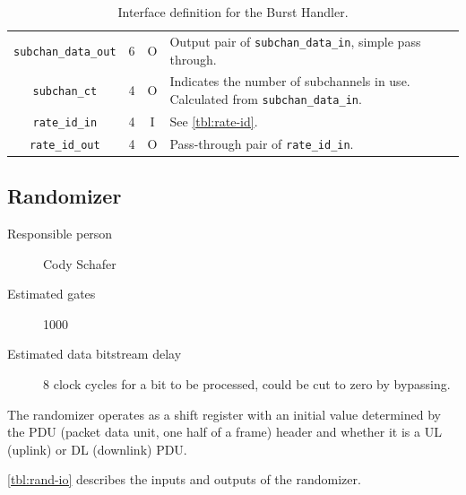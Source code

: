 \documentclass[dvips,10pt,twocolumn]{article}
\newcommand{\wire}{\texttt}
\begin{document}
\begin{table}
\begin{tabularx}{\linewidth}{c|c|c|X}
	\wire{subchan\_data\_out} & 6 & O & Output pair of
	\wire{subchan\_data\_in}, simple pass through. \\

	\wire{subchan\_ct} & 4 & O & Indicates the number of subchannels in
	use. Calculated from \wire{subchan\_data\_in}. \\

	\wire{rate\_id\_in} & 4 & I  & See \autoref{tbl:rate-id}. \\

	\wire{rate\_id\_out} & 4 & O & Pass-through pair of
	\wire{rate\_id\_in}. \\

\end{tabularx}
\caption{Interface definition for the Burst Handler.}
\end{table}


\subsection{Randomizer}
\label{sec:rand}
\begin{description}
	\item[Responsible person] Cody Schafer 
	\item[Estimated gates] 1000
	\item[Estimated data bitstream delay] 8 clock cycles for a bit to be
		processed, could be cut to zero by bypassing.
\end{description}

The randomizer operates as a shift register with an initial value
determined by the PDU (packet data unit, one half of a frame) header
and whether it is a UL (uplink) or DL (downlink) PDU.

\autoref{tbl:rand-io} describes the inputs and outputs of the
randomizer.
\end{document}
